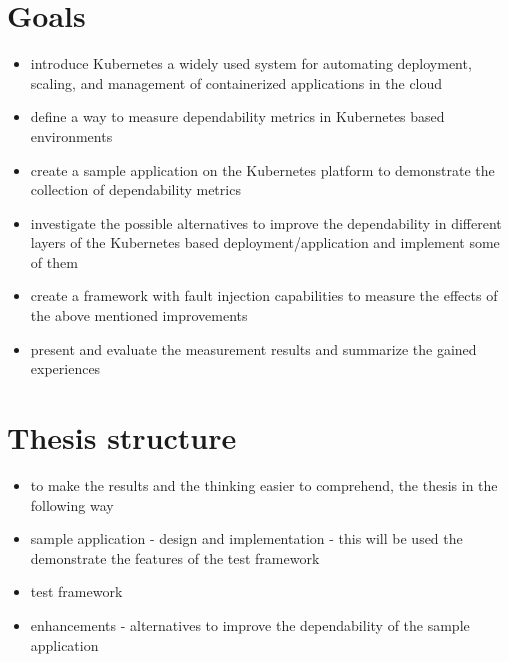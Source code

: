 \section{Goals}

\begin{itemize}
	\item introduce Kubernetes a widely used system for automating deployment, scaling, and management of containerized applications in the cloud
	\item define a way to measure dependability metrics in Kubernetes based environments
	\item create a sample application on the Kubernetes platform to demonstrate the collection of dependability metrics
	\item investigate the possible alternatives to improve the dependability in different layers of the Kubernetes based deployment/application and implement some of them
	\item create a framework with fault injection capabilities to measure the effects of the above mentioned improvements
	\item present and evaluate the measurement results and summarize the gained experiences
\end{itemize}

\section{Thesis structure}

\begin{itemize}
	\item to make the results and the thinking easier to comprehend, the thesis in the following way
	\item sample application - design and implementation - this will be used the demonstrate the features of the test framework
	\item test framework
	\item enhancements - alternatives to improve the dependability of the sample application
\end{itemize}

























